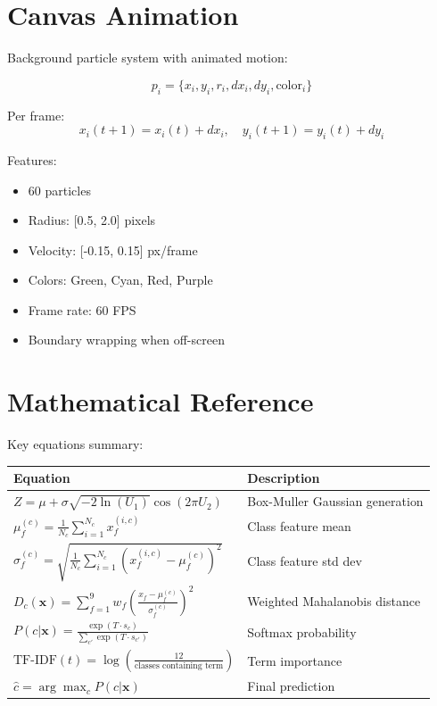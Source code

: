 \documentclass[10pt]{article}
\begin{document}
\section{Canvas Animation}

Background particle system with animated motion:

\[
p_i = \{x_i, y_i, r_i, dx_i, dy_i, \text{color}_i\}
\]

Per frame:
\[
x_i(t+1) = x_i(t) + dx_i, \quad y_i(t+1) = y_i(t) + dy_i
\]

Features:
\begin{itemize}
    \item 60 particles
    \item Radius: [0.5, 2.0] pixels
    \item Velocity: [-0.15, 0.15] px/frame
    \item Colors: Green, Cyan, Red, Purple
    \item Frame rate: 60 FPS
    \item Boundary wrapping when off-screen
\end{itemize}

\section{Mathematical Reference}

Key equations summary:

\begin{table}[H]
\centering
\small
\begin{tabular}{|l|p{10cm}|}
\hline
\textbf{Equation} & \textbf{Description} \\
\hline
$Z = \mu + \sigma \sqrt{-2\ln(U_1)} \cos(2\pi U_2)$ & Box-Muller Gaussian generation \\
$\mu_f^{(c)} = \frac{1}{N_c}\sum_{i=1}^{N_c} x_f^{(i,c)}$ & Class feature mean \\
$\sigma_f^{(c)} = \sqrt{\frac{1}{N_c}\sum_{i=1}^{N_c}(x_f^{(i,c)}-\mu_f^{(c)})^2}$ & Class feature std dev \\
$D_c(\mathbf{x}) = \sum_{f=1}^{9} w_f \left(\frac{x_f - \mu_f^{(c)}}{\sigma_f^{(c)}}\right)^2$ & Weighted Mahalanobis distance \\
$P(c|\mathbf{x}) = \frac{\exp(T \cdot s_c)}{\sum_{c'}\exp(T \cdot s_{c'})}$ & Softmax probability \\
$\text{TF-IDF}(t) = \log\left(\frac{12}{\text{classes containing term}}\right)$ & Term importance \\
$\hat{c} = \arg\max_c P(c|\mathbf{x})$ & Final prediction \\
\hline
\end{tabular}
\end{table}
\end{document}

